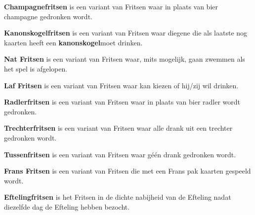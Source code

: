 
\newpage
\drawBar{}

\item \textbf{Champagnefritsen} is een variant van Fritsen waar in plaats van bier champagne gedronken wordt.

\item \textbf{Kanonskogelfritsen} is een variant van Fritsen waar diegene die als laatste nog kaarten heeft een \textbf{kanonskogel}\footnotemark[2] moet drinken. 

\item \textbf{Nat Fritsen} is een variant van Fritsen waar, mits mogelijk, \alleSpelers gaan zwemmen als het spel is afgelopen.

\item \textbf{Laf Fritsen} is een variant van Fritsen waar \eenSpeler kan kiezen of hij/zij wil drinken.

\item \textbf{Radlerfritsen} is een variant van Fritsen waar in plaats van bier radler wordt gedronken.

\item \textbf{Trechterfritsen} is een variant van Fritsen waar alle drank uit een trechter gedronken wordt.

\item \textbf{Tussenfritsen} is een variant van Fritsen waar g\'e\'en drank gedronken wordt.

\item \textbf{Frans Fritsen} is een variant van Fritsen die met een Frans pak kaarten gespeeld wordt.

\item \textbf{Eftelingfritsen} is het Fritsen in de dichte nabijheid van de Efteling nadat \alleSpelers diezelfde dag de Efteling hebben bezocht.
\eindABCLijst


